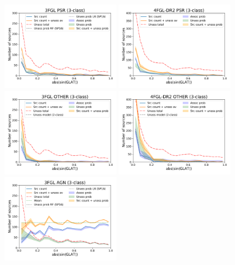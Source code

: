 \documentclass{aa}
\begin{document}
\begin{figure}[h]
\centering
\includegraphics[width=0.45\textwidth]{plots/lat_profile_PSR_3FGL_3classes.pdf}
\includegraphics[width=0.45\textwidth]{plots/lat_profile_PSR_4FGL-DR2_3classes.pdf} \\
\includegraphics[width=0.45\textwidth]{plots/lat_profile_OTHER_3FGL_3classes.pdf}
\includegraphics[width=0.45\textwidth]{plots/lat_profile_OTHER_4FGL-DR2_3classes.pdf} \\ 
\includegraphics[width=0.45\textwidth]{plots/lat_profile_AGN_3FGL_3classes.pdf}

\end{figure}
\end{document}
